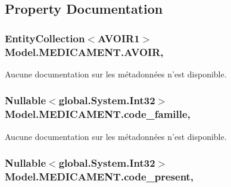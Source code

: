 \subsection{Property Documentation}
\hypertarget{class_model_1_1_m_e_d_i_c_a_m_e_n_t_a16a5647738d2faf685e31fa4d4886bda}{
\subsubsection[{A\-V\-O\-I\-R}]{\setlength{\rightskip}{0pt plus 5cm}Entity\-Collection$<${\bf A\-V\-O\-I\-R1}$>$ Model.\-M\-E\-D\-I\-C\-A\-M\-E\-N\-T.\-A\-V\-O\-I\-R\hspace{0.3cm}{\ttfamily [get]}, {\ttfamily [set]}}}\label{class_model_1_1_m_e_d_i_c_a_m_e_n_t_a16a5647738d2faf685e31fa4d4886bda}


Aucune documentation sur les métadonnées n'est disponible. 

\hypertarget{class_model_1_1_m_e_d_i_c_a_m_e_n_t_a39e97dd11fe652aaa6b30e80694694d3}{
\subsubsection[{code\-\_\-famille}]{\setlength{\rightskip}{0pt plus 5cm}Nullable$<$global.\-System.\-Int32$>$ Model.\-M\-E\-D\-I\-C\-A\-M\-E\-N\-T.\-code\-\_\-famille\hspace{0.3cm}{\ttfamily [get]}, {\ttfamily [set]}}}\label{class_model_1_1_m_e_d_i_c_a_m_e_n_t_a39e97dd11fe652aaa6b30e80694694d3}


Aucune documentation sur les métadonnées n'est disponible. 

\hypertarget{class_model_1_1_m_e_d_i_c_a_m_e_n_t_a39501452dd03c0c20690e387a1e4e324}{
\subsubsection[{code\-\_\-present}]{\setlength{\rightskip}{0pt plus 5cm}Nullable$<$global.\-System.\-Int32$>$ Model.\-M\-E\-D\-I\-C\-A\-M\-E\-N\-T.\-code\-\_\-present\hspace{0.3cm}{\ttfamily [get]}, {\ttfamily [set]}}}\label{class_model_1_1_m_e_d_i_c_a_m_e_n_t_a39501452dd03c0c20690e387a1e4e324}



